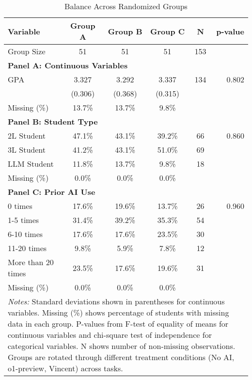 \begin{table}[!htbp]
\setlength{\tabcolsep}{6pt}
\renewcommand{\arraystretch}{1.0}
\centering
\caption{Balance Across Randomized Groups}
\label{tab:balance}
\begin{tabular*}{0.85\textwidth}{@{\extracolsep{\fill}}lccccr@{}}
\hline\hline
Variable & Group A & Group B & Group C & N & p-value \\
\hline
Group Size & 51 & 51 & 51 & 153 & \\
\hline
\multicolumn{6}{l}{\textbf{Panel A: Continuous Variables}} \\
GPA & 3.327 & 3.292 & 3.337 & 134 & 0.802 \\
& (0.306) & (0.368) & (0.315) & & \\
Missing (\%) & 13.7\% & 13.7\% & 9.8\% & & \\
\hline
\multicolumn{6}{l}{\textbf{Panel B: Student Type}} \\
2L Student & 47.1\% & 43.1\% & 39.2\% & 66 & 0.860 \\
3L Student & 41.2\% & 43.1\% & 51.0\% & 69 &  \\
LLM Student & 11.8\% & 13.7\% & 9.8\% & 18 &  \\
Missing (\%) & 0.0\% & 0.0\% & 0.0\% & & \\
\hline
\multicolumn{6}{l}{\textbf{Panel C: Prior AI Use}} \\
0 times & 17.6\% & 19.6\% & 13.7\% & 26 & 0.960 \\
1-5 times & 31.4\% & 39.2\% & 35.3\% & 54 &  \\
6-10 times & 17.6\% & 17.6\% & 23.5\% & 30 &  \\
11-20 times & 9.8\% & 5.9\% & 7.8\% & 12 &  \\
More than 20 times & 23.5\% & 17.6\% & 19.6\% & 31 &  \\
Missing (\%) & 0.0\% & 0.0\% & 0.0\% & & \\
\hline
\multicolumn{6}{p{0.85\textwidth}}{\footnotesize \textit{Notes:} 
Standard deviations shown in parentheses for continuous variables. 
Missing (\%) shows percentage of students with missing data in each group. 
P-values from F-test of equality of means for continuous variables and chi-square test of independence for categorical variables. 
N shows number of non-missing observations. 
Groups are rotated through different treatment conditions (No AI, o1-preview, Vincent) across tasks.} \\
\end{tabular*}
\end{table}